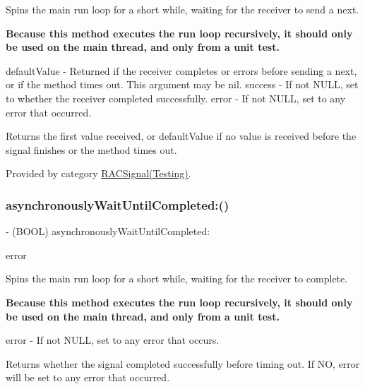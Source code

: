 Spins the main run loop for a short while, waiting for the receiver to send a {\ttfamily next}.

{\bfseries Because this method executes the run loop recursively, it should only be used on the main thread, and only from a unit test.}

default\+Value -\/ Returned if the receiver completes or errors before sending a {\ttfamily next}, or if the method times out. This argument may be nil. success -\/ If not N\+U\+LL, set to whether the receiver completed successfully. error -\/ If not N\+U\+LL, set to any error that occurred.

Returns the first value received, or {\ttfamily default\+Value} if no value is received before the signal finishes or the method times out. 

Provided by category \mbox{\hyperlink{category_r_a_c_signal_07_testing_08_a477114852c0e761a023a35e35ccc1784}{R\+A\+C\+Signal(\+Testing)}}.

\mbox{\label{interface_r_a_c_signal_a29ac4be53792963e1c7e5c59e545e6cd}} 
\subsubsection{\texorpdfstring{asynchronously\+Wait\+Until\+Completed\+:()}{asynchronouslyWaitUntilCompleted:()}\hspace{0.1cm}{\footnotesize\ttfamily [1/3]}}
{\footnotesize\ttfamily -\/ (B\+O\+OL) asynchronously\+Wait\+Until\+Completed\+: \begin{DoxyParamCaption}\item[{(N\+S\+Error $\ast$$\ast$)}]{error }\end{DoxyParamCaption}}

Spins the main run loop for a short while, waiting for the receiver to complete.

{\bfseries Because this method executes the run loop recursively, it should only be used on the main thread, and only from a unit test.}

error -\/ If not N\+U\+LL, set to any error that occurs.

Returns whether the signal completed successfully before timing out. If NO, {\ttfamily error} will be set to any error that occurred. 

